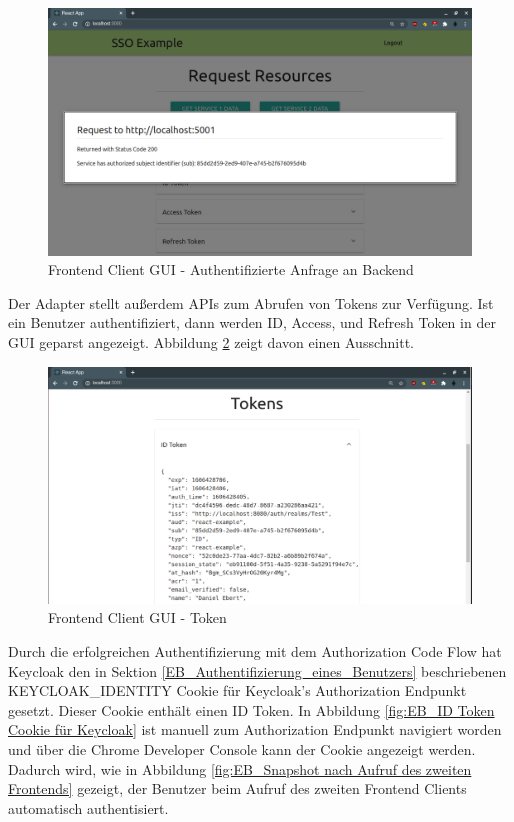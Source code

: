 \begin{figure}[!ht]
	\centering
	\includegraphics[width=1\textwidth]{Images/Ebert/FrontendLoggedInBackendRequest.PNG}
	\caption{Frontend Client GUI - Authentifizierte Anfrage an Backend}
	\label{fig:EB_Authentifizierte Anfrage an Backend}
\end{figure} 

Der Adapter stellt außerdem APIs zum Abrufen von Tokens zur Verfügung. Ist ein Benutzer authentifiziert, dann werden ID, Access, und Refresh Token in der GUI geparst angezeigt. Abbildung \ref{fig:EB_Token} zeigt davon einen Ausschnitt.

\begin{figure}[!ht]
	\centering
	\includegraphics[width=1\textwidth]{Images/Ebert/FrontendIDTokenExample.PNG}
	\caption{Frontend Client GUI - Token}
	\label{fig:EB_Token}
\end{figure}

Durch die erfolgreichen Authentifizierung mit dem Authorization Code Flow hat Keycloak den in Sektion \ref{EB_Authentifizierung_eines_Benutzers} beschriebenen KEYCLOAK\_IDENTITY Cookie für Keycloak's Authorization Endpunkt gesetzt. Dieser Cookie enthält einen ID Token. In Abbildung \ref{fig:EB_ID Token Cookie für Keycloak} ist manuell zum Authorization Endpunkt navigiert worden und über die Chrome Developer Console kann der Cookie angezeigt werden. Dadurch wird, wie in Abbildung \ref{fig:EB_Snapshot nach Aufruf des zweiten Frontends} gezeigt, der Benutzer beim Aufruf des zweiten Frontend Clients automatisch authentisiert.

